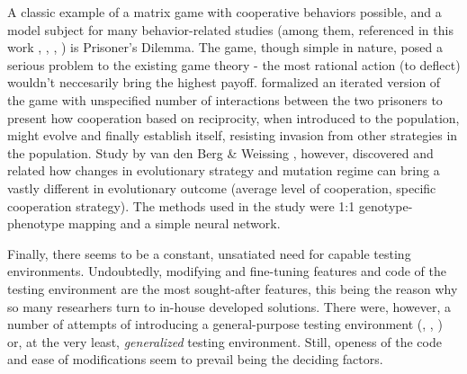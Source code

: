 A classic example of a matrix game with cooperative behaviors possible, and a model subject for many behavior-related studies (among them, referenced in this work \cite{cooperativeandcompetitivelearning}, \cite{cooperationstateoftheart}, \cite{cooperationevolution}, \cite{evolutionofcooperationmechanisms}) is Prisoner's Dilemma. The game, though simple in nature, posed a serious problem to the existing game theory - the most rational action (to deflect) wouldn't neccesarily bring the highest payoff. \cite{cooperationevolution} formalized an iterated version of the game with unspecified number of interactions between the two prisoners to present how cooperation based on reciprocity, when introduced to the population, might evolve and finally establish itself, resisting invasion from other strategies in the population. Study by van den Berg \& Weissing \cite{evolutionofcooperationmechanisms}, however, discovered and related how changes in evolutionary strategy and mutation regime can bring a vastly different in evolutionary outcome (average level of cooperation, specific cooperation strategy). The methods used in the study were 1:1 genotype-phenotype mapping and a simple neural network.

Finally, there seems to be a constant, unsatiated need for capable testing environments. Undoubtedly, modifying and fine-tuning features and code of the testing environment are the most sought-after features, this being the reason why so many researhers turn to in-house developed solutions. There were, however, a number of attempts of introducing a general-purpose testing environment (\cite{mason}, \cite{aisandbox}, \cite{frailweb}) or, at the very least, \textit{generalized} testing environment. Still, openess of the code and ease of modifications seem to prevail being the deciding factors. %
